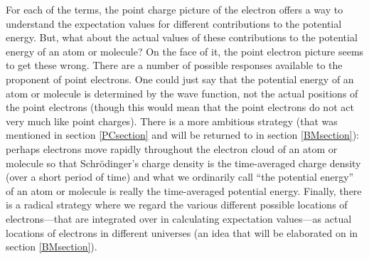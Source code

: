 \documentclass[onecolumn,secnumarabic,amsmath,amssymb,balancelastpage,nofootinbib]{article}
\begin{document}
For each of the terms, the point charge picture of the electron offers a way to understand the expectation values for different contributions to the potential energy.  But, what about the actual values of these contributions to the potential energy of an atom or molecule?  On the face of it, the point electron picture seems to get these wrong.  There are a number of possible responses available to the proponent of point electrons.  One could just say that the potential energy of an atom or molecule is determined by the wave function, not the actual positions of the point electrons (though this would mean that the point electrons do not act very much like point charges).  There is a more ambitious strategy (that was mentioned in section \ref{PCsection} and will be returned to in section \ref{BMsection}): perhaps electrons move rapidly throughout the electron cloud of an atom or molecule so that Schr\"{o}dinger's charge density is the time-averaged charge density (over a short period of time) and what we ordinarily call ``the potential energy'' of an atom or molecule is really the time-averaged potential energy.  Finally, there is a radical strategy where we regard the various different possible locations of electrons---that are integrated over in calculating expectation values---as actual locations of electrons in different universes (an idea that will be elaborated on in section \ref{BMsection}).
\end{document}
